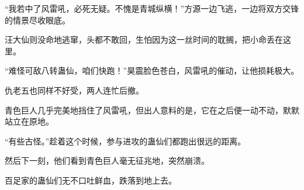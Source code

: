 \begin{this_body}
“我若中了风雷吼，必死无疑。不愧是青城纵横！”方源一边飞逃，一边将双方交锋的情景尽收眼底。

汪大仙则没命地逃窜，头都不敢回，生怕因为这一丝时间的耽搁，把小命丢在这里。

“难怪可敌八转蛊仙，咱们快跑！”昊震脸色苍白，风雷吼的催动，让他损耗极大。

仇老五也同样不好受，两人连忙后撤。

青色巨人几乎完美地挡住了风雷吼，但出人意料的是，它在之后便一动不动，默默站立在原地。

“有些古怪。”趁着这个时候，参与进攻的蛊仙们都跑出很远的距离。

然后下一刻，他们看到青色巨人毫无征兆地，突然崩溃。

百足家的蛊仙们无不口吐鲜血，跌落到地上去。

\end{this_body}

